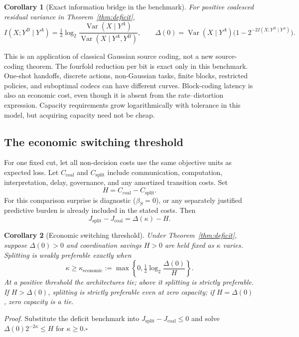 \documentclass[11pt]{article}
\newtheorem{corollary}{Corollary}
\begin{document}
\begin{corollary}[Exact information bridge in the benchmark]
\label{cor:mibridge}
For positive coalesced residual variance in Theorem~\ref{thm:deficit},
\[
I(X;Y^B\mid Y^A)=\tfrac12\log_2
\frac{\operatorname{Var}(X\mid Y^A)}
     {\operatorname{Var}(X\mid Y^A,Y^B)},\qquad
\Delta(0)=\operatorname{Var}(X\mid Y^A)
\big(1-2^{-2I(X;Y^B\mid Y^A)}\big).
\]
\end{corollary}

This is an application of classical Gaussian source coding, not a new
source-coding theorem. The fourfold reduction per bit is exact only in this
benchmark. One-shot handoffs, discrete actions, non-Gaussian tasks, finite
blocks, restricted policies, and suboptimal codecs can have different curves.
Block-coding latency is also an economic cost, even though it is absent from
the rate--distortion expression. Capacity requirements grow logarithmically
with tolerance in this model, but acquiring capacity need not be cheap.

\subsection{The economic switching threshold}

For one fixed cut, let all non-decision costs use the same objective units as
expected loss. Let $C_{\mathrm{coal}}$ and $C_{\mathrm{split}}$ include
communication, computation, interpretation, delay, governance, and any
amortized transition costs. Set
\[
H=C_{\mathrm{coal}}-C_{\mathrm{split}}.
\]
For this comparison surprise is diagnostic ($\beta_S=0$), or any separately
justified predictive burden is already included in the stated costs. Then
\[
J_{\mathrm{split}}-J_{\mathrm{coal}}=\Delta(\kappa)-H.
\]

\begin{corollary}[Economic switching threshold]
\label{cor:economic}
Under Theorem~\ref{thm:deficit}, suppose $\Delta(0)>0$ and coordination
savings $H>0$ are held fixed as $\kappa$ varies. Splitting is weakly
preferable exactly when
\[
\kappa\geq\kappa_{\mathrm{economic}}
:=\max\left\{0,\tfrac12\log_2\frac{\Delta(0)}{H}\right\}.
\]
At a positive threshold the architectures tie; above it splitting is strictly
preferable. If $H>\Delta(0)$, splitting is strictly preferable even at zero
capacity; if $H=\Delta(0)$, zero capacity is a tie.
\end{corollary}
\noindent\textit{Proof.} Substitute the deficit benchmark into
$J_{\mathrm{split}}-J_{\mathrm{coal}}\leq0$ and solve
$\Delta(0)2^{-2\kappa}\leq H$ for $\kappa\geq0$.\hfill$\square$
\end{document}
